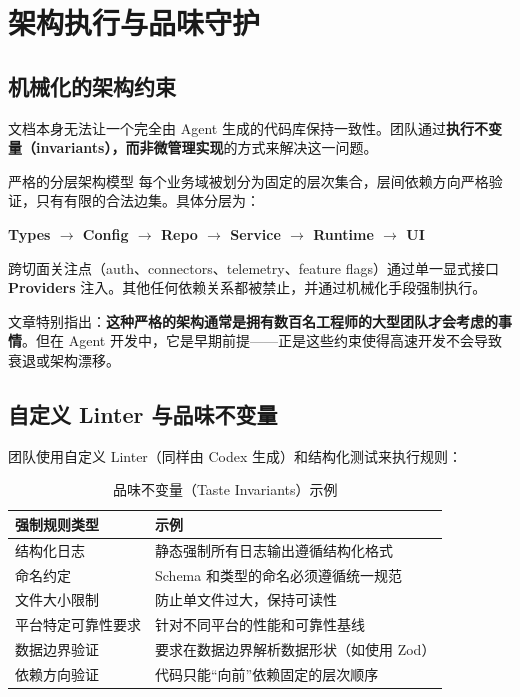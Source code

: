 \section{架构执行与品味守护}

\subsection{机械化的架构约束}

文档本身无法让一个完全由 Agent 生成的代码库保持一致性。团队通过\textbf{执行不变量（invariants），而非微管理实现}的方式来解决这一问题。

\begin{importantbox}{严格的分层架构模型}
每个业务域被划分为固定的层次集合，层间依赖方向严格验证，只有有限的合法边集。具体分层为：

\textbf{Types $\rightarrow$ Config $\rightarrow$ Repo $\rightarrow$ Service $\rightarrow$ Runtime $\rightarrow$ UI}

跨切面关注点（auth、connectors、telemetry、feature flags）通过单一显式接口 \textbf{Providers} 注入。其他任何依赖关系都被禁止，并通过机械化手段强制执行。
\end{importantbox}

文章特别指出：\textbf{这种严格的架构通常是拥有数百名工程师的大型团队才会考虑的事情}。但在 Agent 开发中，它是早期前提——正是这些约束使得高速开发不会导致衰退或架构漂移。

\subsection{自定义 Linter 与品味不变量}

团队使用自定义 Linter（同样由 Codex 生成）和结构化测试来执行规则：

\begin{table}[H]
\centering
\small
\begin{tabular}{p{4.5cm}p{8.5cm}}
\toprule
\textbf{强制规则类型} & \textbf{示例} \\
\midrule
结构化日志 & 静态强制所有日志输出遵循结构化格式 \\
命名约定 & Schema 和类型的命名必须遵循统一规范 \\
文件大小限制 & 防止单文件过大，保持可读性 \\
平台特定可靠性要求 & 针对不同平台的性能和可靠性基线 \\
数据边界验证 & 要求在数据边界解析数据形状（如使用 Zod） \\
依赖方向验证 & 代码只能``向前''依赖固定的层次顺序 \\
\bottomrule
\end{tabular}
\caption{品味不变量（Taste Invariants）示例}
\end{table}

